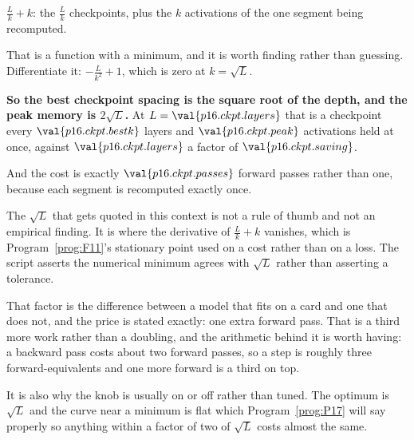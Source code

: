 \begin{fr}
\begin{ansblock}
$\frac{L}{k} + k$: the $\frac{L}{k}$ checkpoints, plus the $k$ activations of
the one segment being recomputed.
\end{ansblock}

That is a function with a minimum, and it is worth finding rather than
guessing. Differentiate it: $-\frac{L}{k^{2}} + 1$, which is zero at
$k = \sqrt{L}$.

\textbf{So the best checkpoint spacing is the square root of the depth, and the
peak memory is $2\sqrt{L}$.} At $L = \val{p16.ckpt.layers}$ that is a
checkpoint every $\val{p16.ckpt.bestk}$ layers and
$\val{p16.ckpt.peak}$ activations held at once, against
$\val{p16.ckpt.layers}$ \dash{} a factor of $\val{p16.ckpt.saving}$.

And the cost is exactly $\val{p16.ckpt.passes}$ forward passes rather than one,
because each segment is recomputed exactly once.

\begin{note}
The $\sqrt{L}$ that gets quoted in this context is not a rule of thumb and not
an empirical finding. It is where the derivative of $\frac{L}{k} + k$
vanishes, which is Program~\ref{prog:F11}'s stationary point used on a cost
rather than on a loss. The script asserts the numerical minimum agrees with
$\sqrt{L}$ rather than asserting a tolerance.
\end{note}
\end{fr}

\begin{fr}
\begin{aibox}
That factor is the difference between a model that fits on a card and one that
does not, and the price is stated exactly: one extra forward pass. That is a
third more work rather than a doubling, and the arithmetic behind it is worth
having: a backward pass costs about two forward passes, so a step is roughly
three forward-equivalents and one more forward is a third on top.

It is also why the knob is usually on or off rather than tuned. The optimum is
$\sqrt{L}$ and the curve near a minimum is flat \dash{} which
Program~\ref{prog:P17} will say properly \dash{} so anything within a factor
of two of $\sqrt{L}$ costs almost the same.
\end{aibox}
\end{fr}


